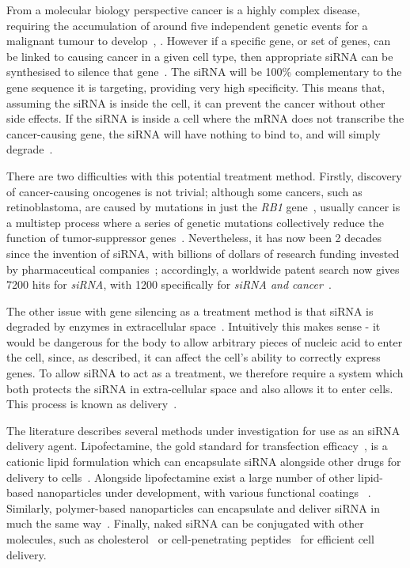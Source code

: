 From a molecular biology perspective cancer is a highly complex disease, requiring the accumulation of around five independent genetic events for a malignant tumour to develop~\cite[\textit{ch. 9}]{murray1993cell}, \cite[\textit{ch. 6}]{knowles2005introduction}.
However if a specific gene, or set of genes, can be linked to causing cancer in a given cell type, then appropriate siRNA can be synthesised to silence that gene~\cite{dorsett2004sirnas}.
The siRNA will be 100\% complementary to the gene sequence it is targeting, providing very high specificity.
This means that, assuming the siRNA is inside the cell, it can prevent the cancer without other side effects.
If the siRNA is inside a cell where the mRNA does not transcribe the cancer-causing gene, the siRNA will have nothing to bind to, and will simply degrade~\cite{dorsett2004sirnas}.

There are two difficulties with this potential treatment method.
Firstly, discovery of cancer-causing oncogenes is not trivial; although some cancers, such as retinoblastoma, are caused by mutations in just the \textit{RB1} gene~\cite{chial2008tumor}, usually cancer is a multistep process where a series of genetic mutations collectively reduce the function of tumor-suppressor genes~\cite[\textit{ch. 9}]{murray1993cell}\cite[\textit{ch. 24}]{lodish1999molecular}.
Nevertheless, it has now been 2 decades since the invention of siRNA, with billions of dollars of research funding invested by pharmaceutical companies~\cite{chakraborty2017therapeutic}; accordingly, a worldwide patent search now gives \num{7200} hits for \textit{siRNA}, with \num{1200} specifically for \textit{siRNA and cancer}~\cite{sirnapatent}.

The other issue with gene silencing as a treatment method is that siRNA is degraded by enzymes in extracellular space~\cite{dorsett2004sirnas}.
Intuitively this makes sense - it would be dangerous for the body to allow arbitrary pieces of nucleic acid to enter the cell, since, as described, it can affect the cell's ability to correctly express genes.
To allow siRNA to act as a treatment, we therefore require a system which both protects the siRNA in extra-cellular space and also allows it to enter cells.
This process is known as delivery~\cite{tiwari2012drug}.

The literature describes several methods under investigation for use as an siRNA delivery agent.
Lipofectamine, the gold standard for transfection efficacy~\cite{thermolipofectamine}, is a cationic lipid formulation which can encapsulate siRNA alongside other drugs for delivery to cells~\cite{liu2017efficient}.
Alongside lipofectamine exist a large number of other lipid-based nanoparticles under development, with various functional coatings ~\cite{xu2015delivery}. %
Similarly, polymer-based nanoparticles can encapsulate and deliver siRNA in much the same way~\cite{sahoo2003nanotech, wang2009advances}.
Finally, naked siRNA can be conjugated with other molecules, such as cholesterol~\cite{soutschek2004therapeutic} or cell-penetrating peptides~\cite{chiu2004visualizing} for efficient cell delivery.

